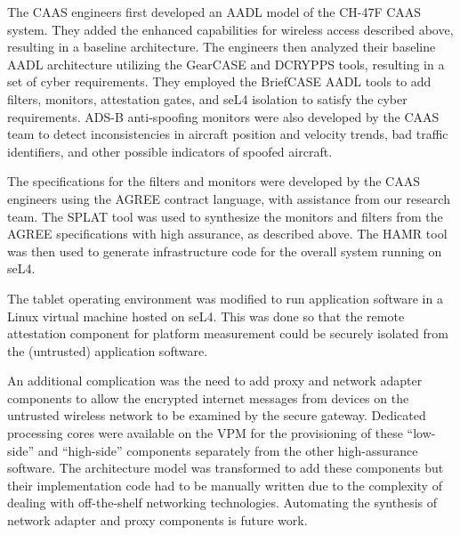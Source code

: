 
The CAAS engineers first developed an AADL model of the CH-47F CAAS system. They added the
enhanced capabilities for wireless access described above, resulting in a baseline architecture. The 
engineers then analyzed their baseline AADL architecture utilizing the GearCASE and DCRYPPS tools,
resulting in a set of cyber requirements. They employed the BriefCASE AADL tools to add
filters, monitors, attestation gates, and seL4 isolation to satisfy the cyber
requirements. ADS-B anti-spoofing monitors were also developed by the CAAS team to 
detect inconsistencies in aircraft position and velocity trends,
bad traffic identifiers, and other possible indicators of spoofed aircraft.

The specifications for the filters and monitors were developed by the CAAS engineers
using the AGREE contract language, with assistance from our research team.  The SPLAT tool was
used to synthesize the monitors and filters from the AGREE specifications
with high assurance, as described above. The HAMR tool was then used
to generate infrastructure code for the overall system running on seL4.

The tablet operating environment was modified to run application software in a Linux virtual machine
hosted on seL4.  This was done so that the remote attestation component for platform measurement could
be securely isolated from the (untrusted) application software.  


An additional complication was the need to add proxy and network adapter components to 
allow the encrypted internet messages from devices on the untrusted wireless network to be examined by the 
secure gateway.  Dedicated processing cores were available on the VPM for the provisioning of these ``low-side'' and ``high-side''
components separately from the other high-assurance software.  The architecture model was transformed to add these 
components but their implementation code had to be manually written due to the complexity of dealing with
off-the-shelf networking technologies.  Automating the synthesis of network adapter and proxy components
is future work.

